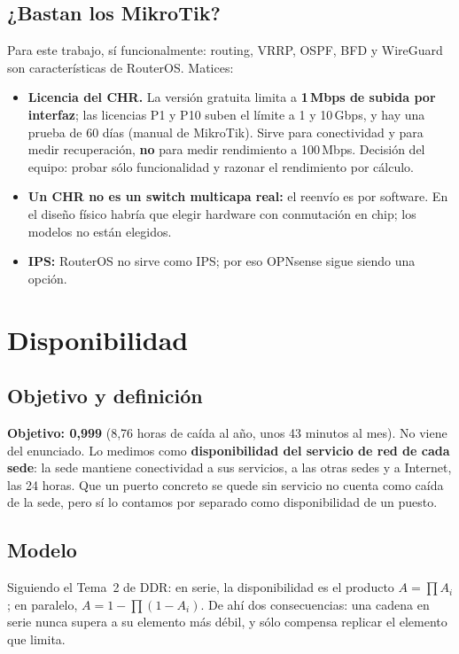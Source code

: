 \documentclass[11pt,a4paper]{article}
\begin{document}
\subsection{¿Bastan los MikroTik?}\label{sec:lic}
Para este trabajo, sí funcionalmente: routing, VRRP, OSPF, BFD y WireGuard son características de RouterOS. Matices:
\begin{itemize}
\item \textbf{Licencia del CHR.} La versión gratuita limita a \textbf{1\,Mbps de subida por interfaz}; las licencias P1 y P10 suben el límite a 1 y 10\,Gbps, y hay una prueba de 60 días (manual de MikroTik). Sirve para conectividad y para medir recuperación, \textbf{no} para medir rendimiento a 100\,Mbps. Decisión del equipo: probar sólo funcionalidad y razonar el rendimiento por cálculo.
\item \textbf{Un CHR no es un switch multicapa real:} el reenvío es por software. En el diseño físico habría que elegir hardware con conmutación en chip; los modelos no están elegidos.
\item \textbf{IPS:} RouterOS no sirve como IPS; por eso OPNsense sigue siendo una opción.
\end{itemize}

\section{Disponibilidad}\label{sec:disp}
\subsection{Objetivo y definición}
\textbf{Objetivo: 0,999} (8,76 horas de caída al año, unos 43 minutos al mes). No viene del enunciado. Lo medimos como \textbf{disponibilidad del servicio de red de cada sede}: la sede mantiene conectividad a sus servicios, a las otras sedes y a Internet, las 24 horas. Que un puerto concreto se quede sin servicio no cuenta como caída de la sede, pero sí lo contamos por separado como disponibilidad de un puesto.

\subsection{Modelo}
Siguiendo el Tema~2 de DDR: en serie, la disponibilidad es el producto $A=\prod A_i$; en paralelo, $A=1-\prod(1-A_i)$. De ahí dos consecuencias: una cadena en serie nunca supera a su elemento más débil, y sólo compensa replicar el elemento que limita.
\end{document}
